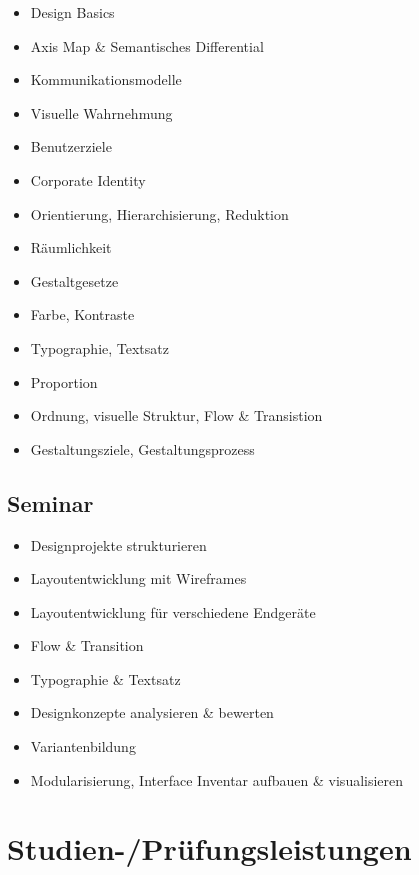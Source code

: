 \begin{itemize}
\tightlist
\item
  Design Basics
\item
  Axis Map \& Semantisches Differential
\item
  Kommunikationsmodelle
\item
  Visuelle Wahrnehmung
\item
  Benutzerziele
\item
  Corporate Identity
\item
  Orientierung, Hierarchisierung, Reduktion
\item
  Räumlichkeit
\item
  Gestaltgesetze
\item
  Farbe, Kontraste
\item
  Typographie, Textsatz
\item
  Proportion
\item
  Ordnung, visuelle Struktur, Flow \& Transistion
\item
  Gestaltungsziele, Gestaltungsprozess
\end{itemize}

\hypertarget{seminarpathlabelmi-2017modulbeschreibungen-bachelorba_screendesign}{%
\subsection*{Seminar\label{/mi-2017/modulbeschreibungen-bachelor/BA_Screendesign}}\label{seminarpathlabelmi-2017modulbeschreibungen-bachelorba_screendesign}}

\begin{itemize}
\tightlist
\item
  Designprojekte strukturieren
\item
  Layoutentwicklung mit Wireframes
\item
  Layoutentwicklung für verschiedene Endgeräte
\item
  Flow \& Transition
\item
  Typographie \& Textsatz
\item
  Designkonzepte analysieren \& bewerten
\item
  Variantenbildung
\item
  Modularisierung, Interface Inventar aufbauen \& visualisieren
\end{itemize}

\hypertarget{studien-pruxfcfungsleistungenpathlabelmi-2017modulbeschreibungen-bachelorba_screendesign}{%
\section*{Studien-/Prüfungsleistungen\label{/mi-2017/modulbeschreibungen-bachelor/BA_Screendesign}}\label{studien-pruxfcfungsleistungenpathlabelmi-2017modulbeschreibungen-bachelorba_screendesign}}

